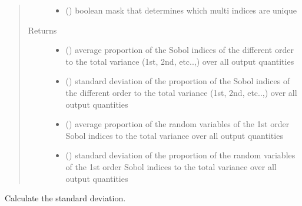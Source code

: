 \documentclass[letterpaper,10pt,english,openany,oneside]{sphinxmanual}
\begin{document}
\begin{fulllineitems}
\begin{fulllineitems}
\begin{quote}
\begin{description}
\begin{itemize}
\item {} 
 () \textendash{} boolean mask that determines which multi indices are unique

\end{itemize}

\item[{Returns}] \leavevmode
\begin{itemize}
\item {} 
 () \textendash{} average proportion of the Sobol indices of the different order to the total variance (1st, 2nd, etc..,)
over all output quantities

\item {} 
 () \textendash{} standard deviation of the proportion of the Sobol indices of the different order to the total variance
(1st, 2nd, etc..,) over all output quantities

\item {} 
 () \textendash{} average proportion of the random variables of the 1st order Sobol indices to the total variance over all
output quantities

\item {} 
 () \textendash{} standard deviation of the proportion of the random variables of the 1st order Sobol indices to the total
variance over all output quantities

\end{itemize}


\end{description}\end{quote}

\end{fulllineitems}


\begin{fulllineitems}
\label{\detokenize{pygpc:pygpc.gpc.gPC.get_standard_deviation}}
Calculate the standard deviation.


\end{fulllineitems}
\end{fulllineitems}
\end{document}
